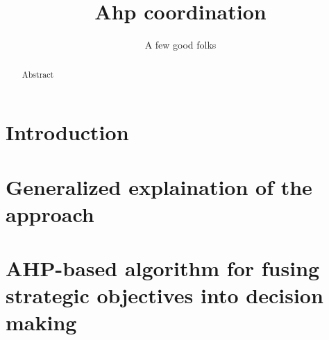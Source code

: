 \documentclass{article}
\author{A few good folks}
\title{Ahp coordination}
\begin{document}
    \maketitle

    \begin{abstract}
        Abstract
    \end{abstract}

    \section{Introduction}

    

    

    \section{Generalized explaination of the approach}
    \label{sect:approachGen}

    

    \section{AHP-based algorithm for fusing strategic objectives into decision making}
    \label{sect:approachFormal}

    

    
    \label{sect:relayRace}

    \medskip

    

    
\end{document}

